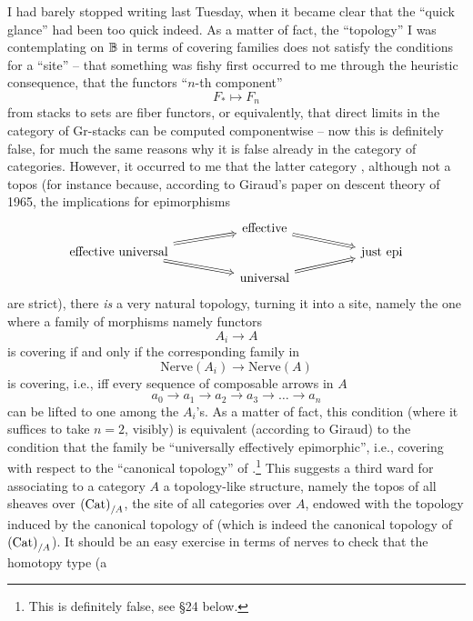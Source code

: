 \bigbreak

\presectionfill{}\par

\label{sec:20}%
I had barely stopped writing last Tuesday, when it became clear that
the ``quick glance'' had been too quick indeed. As a matter of fact,
the ``topology'' I was contemplating on ${\mathbb{B}}$ in terms of covering
families does not satisfy the conditions for a ``site'' -- that
something was fishy first occurred to me through the heuristic
consequence, that the functors ``$n$-th component''
\[F_* \mapsto F_n\]
from stacks to sets are fiber functors, or equivalently, that direct
limits in the category of Gr-stacks can be computed componentwise --
now this is definitely false, for much the same reasons why it is
false already in the category \Cat{} of categories. However, it
occurred to me that the latter category \Cat{}, although not a topos
(for instance because, according to Giraud's paper on descent theory
of 1965, the implications for epimorphisms
\[
\begin{tikzcd}[row sep=tiny,column sep=huge,arrows=Rightarrow]
  & \text{effective} \ar[dr] & \\
  \text{effective universal} \ar[ur] \ar[dr] & & \text{just epi} \\
  & \text{universal} \ar[ur]
\end{tikzcd}
\]
are strict), there \emph{is} a very natural topology, turning it into
a site, namely the one where a family of morphisms namely functors
\[ A_i \to A\]
is covering if and only if the corresponding family in \Sssets
\[ \text{Nerve}(A_i) \to \text{Nerve}(A)\]
is covering, i.e., if{f} every sequence of composable arrows in $A$
\[ a_0 \to a_1 \to a_2 \to a_3 \to \dots \to a_n\]
can be lifted to one among the $A_i$'s. As a matter of fact, this
condition (where it suffices to take $n=2$, visibly) is equivalent
(according to Giraud) to the condition that the family be
``universally effectively epimorphic'', i.e., covering with respect to
the ``canonical topology'' of \Cat{}.\footnote{ This is definitely
  false, see \S24 below.} This suggests a third ward for associating
to a category $A$ a topology-like structure, namely the topos of all
sheaves over ${(\mathrm{Cat})}_{/A}$, the site of all categories over $A$,
endowed with the topology induced by the canonical topology of \Cat{}
(which is indeed the canonical topology of ${(\mathrm{Cat})}_{/A}$). It should be
an easy exercise in terms of nerves to check that the homotopy type (a
